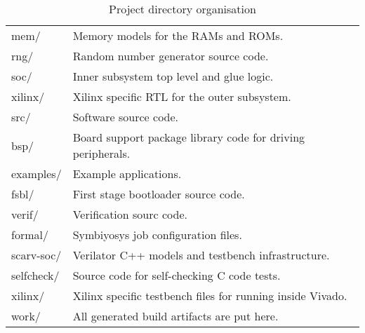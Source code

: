 \begin{table}[H]
\begin{tabular}{ll}
\hspace{1.0cm}     mem/        & Memory models for the RAMs and ROMs. \\
\hspace{1.0cm}     rng/        & Random number generator source code. \\
\hspace{1.0cm}     soc/        & Inner subsystem top level and glue logic. \\
\hspace{1.0cm}     xilinx/     & Xilinx specific RTL for the outer subsystem. \\
\hspace{0.5cm} src/            & Software source code. \\
\hspace{1.0cm}     bsp/        & Board support package library code for driving peripherals. \\
\hspace{1.0cm}     examples/   & Example applications. \\
\hspace{1.0cm}     fsbl/       & First stage bootloader source code. \\
\hspace{0.5cm} verif/          & Verification sourc code. \\
\hspace{1.0cm}     formal/     & Symbiyosys job configuration files. \\
\hspace{1.0cm}     scarv-soc/  & Verilator C++ models and testbench infrastructure. \\
\hspace{1.0cm}     selfcheck/  & Source code for self-checking C code tests. \\
\hspace{1.0cm}     xilinx/     & Xilinx specific testbench files for running inside Vivado. \\
\hspace{0.5cm} work/           & All generated build artifacts are put here. \\
\end{tabular}
\caption{Project directory organisation}
\label{tab:project-organisation}
\end{table}
